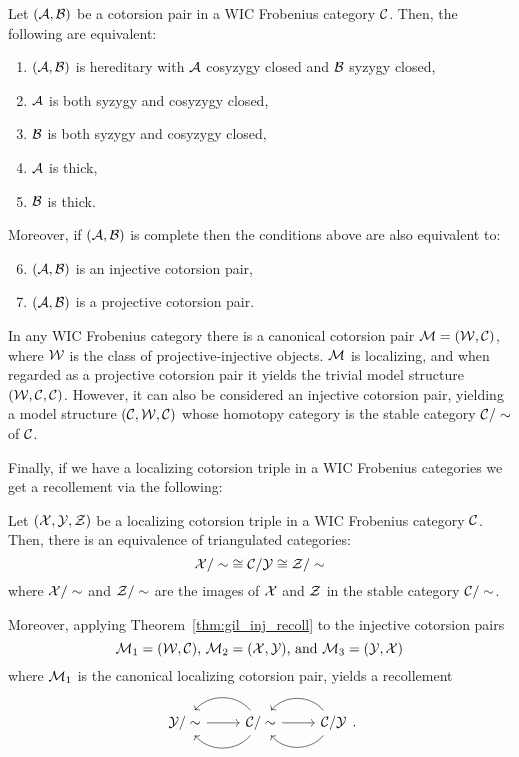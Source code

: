 \begin{prop}{ \cite[Proposition 4.2]{G7}}\label{prop:gil_localizing_pair}
  Let $(\mathcal{A},\mathcal{B})$ be a cotorsion pair in a WIC Frobenius category $\mathcal{C}$. Then, the following are equivalent:
  \begin{enumerate}
    \item $(\mathcal{A},\mathcal{B})$ is hereditary with $\mathcal{A}$ cosyzygy closed and $\mathcal{B}$ syzygy closed,
    \item $\mathcal{A}$ is both syzygy and cosyzygy closed,
    \item $\mathcal{B}$ is both syzygy and cosyzygy closed,
    \item $\mathcal{A}$ is thick,
    \item $\mathcal{B}$ is thick.
  \end{enumerate}

  Moreover, if $(\mathcal{A},\mathcal{B})$ is complete then the conditions above are also equivalent to:
  \begin{enumerate}\setcounter{enumi}{5}
    \item $(\mathcal{A},\mathcal{B})$ is an injective cotorsion pair,
    \item $(\mathcal{A},\mathcal{B})$ is a projective cotorsion pair.
  \end{enumerate}
\end{prop}

\begin{rem}
  \begin{sloppypar}
  In any WIC Frobenius category there is a canonical cotorsion pair $\mathcal{M}=(\mathcal{W},\mathcal{C})$, where $\mathcal{W}$ is the class of projective-injective objects. $\mathcal{M}$ is localizing, and when regarded as a projective cotorsion pair it yields the trivial model structure $(\mathcal{W},\mathcal{C},\mathcal{C})$. However, it can also be considered an injective cotorsion pair, yielding a model structure $(\mathcal{C},\mathcal{W},\mathcal{C})$ whose homotopy category is the stable category ${\mathcal{C}/\sim}$ of $\mathcal{C}$.
  \end{sloppypar}
\end{rem}

Finally, if we have a localizing cotorsion triple in a WIC Frobenius categories we get a recollement via the following:

\begin{cor}{\cite[Corollary~4.5]{G7}}\label{cor:gill_local_recoll}
  Let $(\mathcal{X},\mathcal{Y},\mathcal{Z})$ be a localizing cotorsion triple in a WIC Frobenius category $\mathcal{C}$. Then, there is an equivalence of triangulated categories:
  \[ {\mathcal{X}/\sim} \cong {\mathcal{C}/\mathcal{Y}}  \cong {\mathcal{Z}/\sim} \]
  where $\mathcal{X}/\sim$ and $\mathcal{Z}/\sim$ are the images of $\mathcal{X}$ and $\mathcal{Z}$ in the stable category $\mathcal{C}/\sim$.

  Moreover, applying Theorem~\ref{thm:gil_inj_recoll} to the injective cotorsion pairs
  \[ \mathcal{M}_1=(\mathcal{W},\mathcal{C})\text{, }\mathcal{M}_2=(\mathcal{X},\mathcal{Y})\text{, and }\mathcal{M}_3=(\mathcal{Y},\mathcal{X}) \]
  where $\mathcal{M}_1$ is the canonical localizing cotorsion pair, yields a recollement
  \begin{equation*}
    \recdiagram{\Y/\sim}{\C/\sim}{\C/\Y}.
  \end{equation*}
\end{cor}


